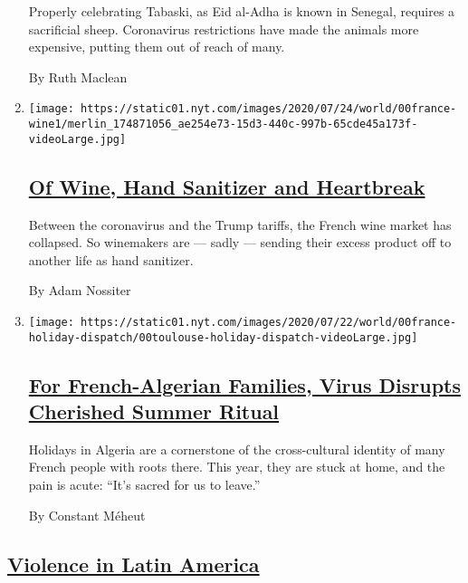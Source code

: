 \begin{enumerate}
  Properly celebrating Tabaski, as Eid al-Adha is known in Senegal,
  requires a sacrificial sheep. Coronavirus restrictions have made the
  animals more expensive, putting them out of reach of many.

  By Ruth Maclean
\item
  \texttt{[image: https://static01.nyt.com/images/2020/07/24/world/00france-wine1/merlin\_174871056\_ae254e73-15d3-440c-997b-65cde45a173f-videoLarge.jpg]}

  \hypertarget{of-wine-hand-sanitizer-and-heartbreak}{%
  \subsection{\texorpdfstring{\href{/2020/07/27/world/europe/france-alsace-wine-coronavirus.html}{Of
  Wine, Hand Sanitizer and
  Heartbreak}}{Of Wine, Hand Sanitizer and Heartbreak}}\label{of-wine-hand-sanitizer-and-heartbreak}}

  Between the coronavirus and the Trump tariffs, the French wine market
  has collapsed. So winemakers are --- sadly --- sending their excess
  product off to another life as hand sanitizer.

  By Adam Nossiter
\item
  \texttt{[image: https://static01.nyt.com/images/2020/07/22/world/00france-holiday-dispatch/00toulouse-holiday-dispatch-videoLarge.jpg]}

  \hypertarget{for-french-algerian-families-virus-disrupts-cherished-summer-ritual}{%
  \subsection{\texorpdfstring{\href{/2020/07/26/world/europe/france-algeria-summer-vacations.html}{For
  French-Algerian Families, Virus Disrupts Cherished Summer
  Ritual}}{For French-Algerian Families, Virus Disrupts Cherished Summer Ritual}}\label{for-french-algerian-families-virus-disrupts-cherished-summer-ritual}}

  Holidays in Algeria are a cornerstone of the cross-cultural identity
  of many French people with roots there. This year, they are stuck at
  home, and the pain is acute: ``It's sacred for us to leave.''

  By Constant Méheut
\end{enumerate}

\hypertarget{violence-in-latin-america}{%
\subsection{\texorpdfstring{\href{/spotlight/violence-in-latin-america}{Violence
in Latin
America}}{Violence in Latin America}}\label{violence-in-latin-america}}

